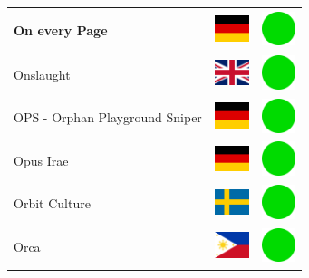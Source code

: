 \documentclass[12pt, a4paper, twoside]{report}
\begin{document}
\begin{center}
\begin{longtable}{|p{5cm}|p{2cm}|p{2cm}|}
 On every Page                                              & \includegraphics[width=1cm]{../4x3/de} &   \includegraphics[width=1cm]{../likes/y} \\ \hline
 Onslaught                                                  & \includegraphics[width=1cm]{../4x3/gb} &   \includegraphics[width=1cm]{../likes/y} \\ \hline
 OPS - Orphan Playground Sniper                             & \includegraphics[width=1cm]{../4x3/de} &   \includegraphics[width=1cm]{../likes/y} \\ \hline
 Opus Irae                                                  & \includegraphics[width=1cm]{../4x3/de} &   \includegraphics[width=1cm]{../likes/y} \\ \hline
 Orbit Culture                                              & \includegraphics[width=1cm]{../4x3/se} &   \includegraphics[width=1cm]{../likes/y} \\ \hline
 Orca                                                       & \includegraphics[width=1cm]{../4x3/ph} &   \includegraphics[width=1cm]{../likes/y} \\ \hline

\end{longtable}
\end{center}
\end{document}
